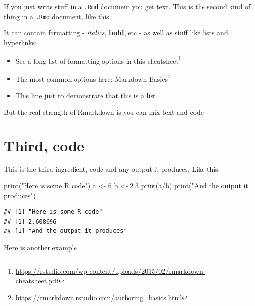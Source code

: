 \documentclass[
  12pt,
  a5paper,
]{book}
\newenvironment{Shaded}{\begin{snugshade}}{\end{snugshade}}
\newcommand{\DecValTok}[1]{\textcolor[rgb]{0.00,0.00,0.81}{#1}}
\newcommand{\FloatTok}[1]{\textcolor[rgb]{0.00,0.00,0.81}{#1}}
\newcommand{\FunctionTok}[1]{\textcolor[rgb]{0.00,0.00,0.00}{#1}}
\newcommand{\NormalTok}[1]{#1}
\newcommand{\OtherTok}[1]{\textcolor[rgb]{0.56,0.35,0.01}{#1}}
\newcommand{\SpecialCharTok}[1]{\textcolor[rgb]{0.00,0.00,0.00}{#1}}
\newcommand{\StringTok}[1]{\textcolor[rgb]{0.31,0.60,0.02}{#1}}
\DeclareRobustCommand{\href}[2]{#2\footnote{\url{#1}}}
\providecommand{\tightlist}{%
  \setlength{\itemsep}{0pt}\setlength{\parskip}{0pt}}
\begin{document}
If you just write stuff in a \texttt{.Rmd} document you get text. This is the second kind of thing in a \texttt{.Rmd} document, like this.

It can contain formatting - \emph{italics}, \textbf{bold}, etc - as well as stuff like lists and hyperlinks:

\begin{itemize}
\tightlist
\item
  See a long list of formatting options in this \href{https://rstudio.com/wp-content/uploads/2015/02/rmarkdown-cheatsheet.pdf}{cheatsheet}
\item
  The most common options here: \href{https://rmarkdown.rstudio.com/authoring_basics.html}{Markdown Basics}
\item
  This line just to demonstrate that this is a list
\end{itemize}

But the real strength of Rmarkdown is you can mix text and code

\hypertarget{third-code}{%
\section{Third, code}\label{third-code}}

This is the third ingredient, code and any output it produces. Like this:

\begin{Shaded}
\begin{Highlighting}[]
\FunctionTok{print}\NormalTok{(}\StringTok{"Here is some R code"}\NormalTok{)}
\NormalTok{a }\OtherTok{\textless{}{-}} \DecValTok{6}
\NormalTok{b }\OtherTok{\textless{}{-}} \FloatTok{2.3}
\FunctionTok{print}\NormalTok{(a}\SpecialCharTok{/}\NormalTok{b)}
\FunctionTok{print}\NormalTok{(}\StringTok{"And the output it produces"}\NormalTok{)}
\end{Highlighting}
\end{Shaded}

\begin{verbatim}
## [1] "Here is some R code"
## [1] 2.608696
## [1] "And the output it produces"
\end{verbatim}

Here is another example
\end{document}
